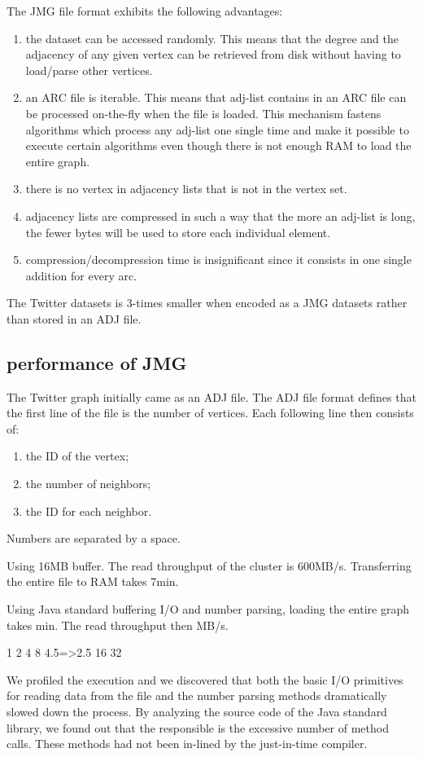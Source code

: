 \documentclass[11pt,a4paper]{article}
\begin{document}
The JMG file format exhibits the following advantages:
\begin{enumerate}
\item the dataset can be accessed randomly. This means that the degree and the adjacency of any given vertex can be retrieved from disk without having to load/parse other vertices.
\item an ARC file is iterable. This means that adj-list contains in an ARC file can be processed on-the-fly when the file is loaded. This mechanism fastens algorithms which process any adj-list one single time and make it possible to execute certain algorithms even though there is not enough RAM to load the entire graph.
\item there is no vertex in adjacency lists that is not in the vertex set.
\item adjacency lists are compressed in such a way that the more an adj-list is long, the fewer bytes will be used to store each individual element.
\item compression/decompression time is insignificant since it consists in one single addition for every arc.
\end{enumerate}

The Twitter datasets is 3-times smaller when encoded as a JMG datasets rather than stored in an ADJ file.


\subsection{performance of JMG}

The Twitter graph initially came as an ADJ file. The ADJ file format defines that the first line of the file is the number of vertices. Each following line then consists of:
\begin{enumerate}
\item the ID of the vertex;
\item the number of neighbors;
\item the ID for each neighbor.
\end{enumerate}
Numbers are separated by a space.


Using 16MB buffer.
The read throughput of the cluster is 600MB/s. Transferring the entire file to RAM takes 7min.

Using Java standard buffering I/O and number parsing, loading the entire graph takes min. The read throughput then MB/s.

1
2
4
8		4.5=>2.5
16
32

We profiled the execution and we discovered that both  the  basic I/O primitives for reading data from the file and the number parsing methods dramatically slowed down the process. By analyzing the source code of the Java standard library, we found out that the responsible is the excessive number of method calls. These methods had not been in-lined by the just-in-time compiler.
\end{document}
